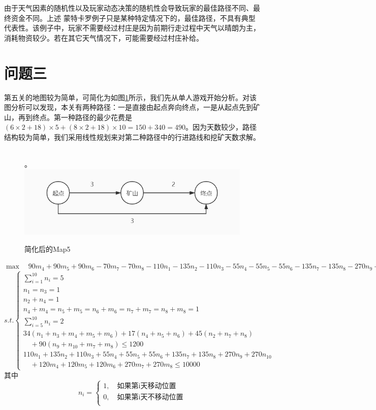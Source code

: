 \documentclass[withoutpre]{cumcmthesis} %
\begin{document}
由于天气因素的随机性以及玩家动态决策的随机性会导致玩家的最佳路径不同、最终资金不同。上述
蒙特卡罗例子只是某种特定情况下的，最佳路径，不具有典型代表性。该例子中，玩家不需要经过村庄是因为前期行走过程中天气以晴朗为主，消耗物资较少。若在其它天气情况下，可能需要经过村庄补给。

\section{问题三}
第五关的地图较为简单，可简化为如图\cref{fig:map5}所示，我们先从单人游戏开始分析。对该图分析可以发现，本关有两种路径：一是直接由起点奔向终点，一是从起点先到矿山，再到终点。第一种路径的最少花费是$(6\times2+18)\times5+(8\times2+18)\times10=150+340=490$。因为天数较少，路径结构较为简单，我们采用线性规划来对第二种路径中的行进路线和挖矿天数求解。\\\\
\begin{figure}[H]
	\centering。
	\includegraphics[scale=0.5]{figures/map3.jpg}
	\caption{简化后的Map5}
	\label{fig:map5}
\end{figure}
$\max\quad 90m_4+90m_5+90m_6-70m_7-70m_8-110n_1-135n_2-110n_3-55n_4-55n_5-55n_6-135n_7-135n_8-270n_9-270n_{10}$\\
$s.t.\begin{cases}
	\sum_{i=1}^{10}n_i=5\\
	n_1=n_3=1\\
	n_2+n_4=1\\
	n_4+m_4=n_5+m_5=n_6+m_6=n_7+m_7=n_8+m_8=1\\
	\sum_{i=5}^{10}n_i=2\\
	34(n_1+n_3+m_4+m_5+m_6)+17(n_4+n_5+n_6)+45(n_2+n_7+n_8)\\\quad+90(n_9+n_{10}+m_7+m_8)\leqslant1200\\
	110n_1+135n_2+110n_3+55n_4+55n_5+55n_6+135n_7+135n_8+270n_9+270n_{10}\\\quad+120m_4+120m_5+120m_6+270m_7+270m_8\leqslant10000
\end{cases}$
其中
$$n_i=\begin{cases}
1,\quad\text{如果第i天移动位置}\\
0,\quad\text{如果第i天不移动位置}\\
\end{cases}$$
\end{document}
